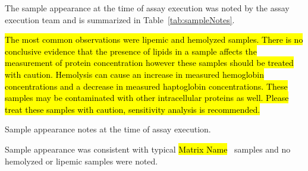 \documentclass[11pt]{article}
\newcommand{\MatrixName}{\hl{Matrix Name} }                  %
\begin{document}
The sample appearance at the time of assay execution was noted by the assay
execution team and is summarized in Table~\ref{tab:sampleNotes}.

\hl{
The most common observations were lipemic and hemolyzed samples. There is no
conclusive evidence that the presence of lipids in a sample affects the
measurement of protein concentration however these samples should be treated
with caution. Hemolysis can cause an increase in measured hemoglobin
concentrations and a decrease in measured haptoglobin concentrations. These
samples may be contaminated with other intracellular proteins as well. Please
treat these samples with caution, sensitivity analysis is recommended.
}


\begin{table}[ht]
  \begin{center}
    
    \caption{Sample appearance notes at the time of assay execution.}
    \label{tab:sampleNotes}
  \end{center}
\end{table}

\else
Sample appearance was consistent with typical \MatrixName~samples and no
hemolyzed or lipemic samples were noted.
\fi
\end{document}
